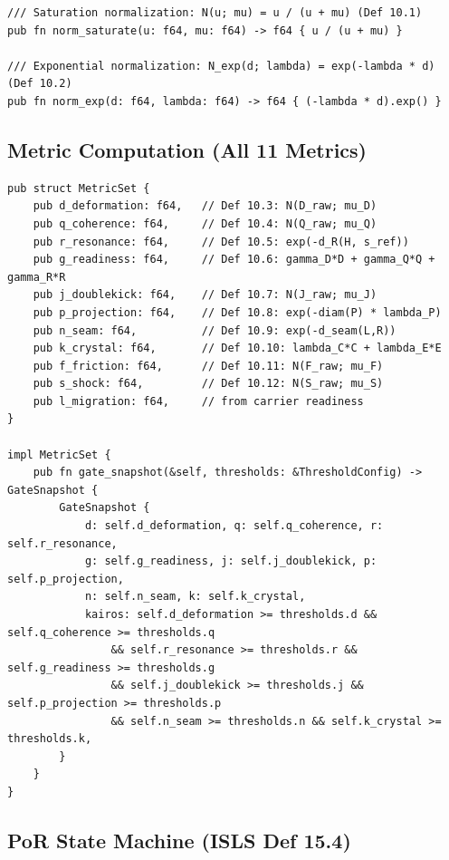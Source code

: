 \documentclass[10pt,a4paper]{article}
\theoremstyle{definition}\newtheorem{definition}{Def}[section]
\theoremstyle{plain}\newtheorem{theorem}{Thm}[section]
\begin{document}
\begin{lstlisting}[style=rust]
/// Saturation normalization: N(u; mu) = u / (u + mu) (Def 10.1)
pub fn norm_saturate(u: f64, mu: f64) -> f64 { u / (u + mu) }

/// Exponential normalization: N_exp(d; lambda) = exp(-lambda * d) (Def 10.2)
pub fn norm_exp(d: f64, lambda: f64) -> f64 { (-lambda * d).exp() }
\end{lstlisting}

\subsection{Metric Computation (All 11 Metrics)}

\begin{lstlisting}[style=rust]
pub struct MetricSet {
    pub d_deformation: f64,   // Def 10.3: N(D_raw; mu_D)
    pub q_coherence: f64,     // Def 10.4: N(Q_raw; mu_Q)
    pub r_resonance: f64,     // Def 10.5: exp(-d_R(H, s_ref))
    pub g_readiness: f64,     // Def 10.6: gamma_D*D + gamma_Q*Q + gamma_R*R
    pub j_doublekick: f64,    // Def 10.7: N(J_raw; mu_J)
    pub p_projection: f64,    // Def 10.8: exp(-diam(P) * lambda_P)
    pub n_seam: f64,          // Def 10.9: exp(-d_seam(L,R))
    pub k_crystal: f64,       // Def 10.10: lambda_C*C + lambda_E*E
    pub f_friction: f64,      // Def 10.11: N(F_raw; mu_F)
    pub s_shock: f64,         // Def 10.12: N(S_raw; mu_S)
    pub l_migration: f64,     // from carrier readiness
}

impl MetricSet {
    pub fn gate_snapshot(&self, thresholds: &ThresholdConfig) -> GateSnapshot {
        GateSnapshot {
            d: self.d_deformation, q: self.q_coherence, r: self.r_resonance,
            g: self.g_readiness, j: self.j_doublekick, p: self.p_projection,
            n: self.n_seam, k: self.k_crystal,
            kairos: self.d_deformation >= thresholds.d && self.q_coherence >= thresholds.q
                && self.r_resonance >= thresholds.r && self.g_readiness >= thresholds.g
                && self.j_doublekick >= thresholds.j && self.p_projection >= thresholds.p
                && self.n_seam >= thresholds.n && self.k_crystal >= thresholds.k,
        }
    }
}
\end{lstlisting}

\subsection{PoR State Machine (ISLS Def 15.4)}
\end{document}
